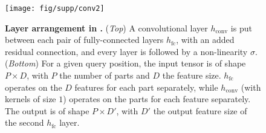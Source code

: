 

\begin{figure}
	\centering
	\texttt{[image: fig/supp/conv2]}  %
	\caption{\textbf{Layer arrangement in \PSDF{}.} (\textit{Top}) A convolutional layer $h_\text{conv}$ is put between each pair of fully-connected layers $h_\text{fc}$, with an added residual connection, and every layer is followed by a non-linearity $\sigma$. (\textit{Bottom}) For a given query position, the input tensor is of shape $P\times D$, with $P$ the number of parts and $D$ the feature size. $h_\text{fc}$ operates on the $D$ features for each part separately, while $h_\text{conv}$ (with kernels of size $1$) operates on the parts for each feature separately. The output is of shape $P\times D'$, with $D'$ the output feature size of the second $h_\text{fc}$ layer.}
	\label{fig:supp-conv}
\end{figure}